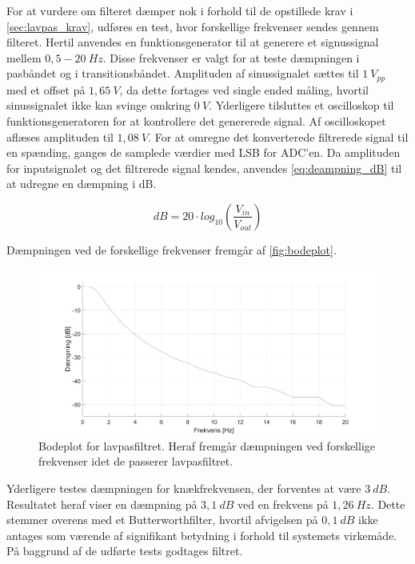 For at vurdere om filteret dæmper nok i forhold til de opstillede krav i \autoref{sec:lavpas_krav}, udføres en test, hvor forskellige frekvenser sendes gennem filteret. 
Hertil anvendes en funktionsgenerator til at generere et signussignal mellem $0,5-20~Hz$. 
Disse frekvenser er valgt for at teste dæmpningen i pasbåndet og i transitionsbåndet.  
Amplituden af sinussignalet sættes til $1~V_{pp}$ med et offset på $1,65~V$, da dette fortages ved single ended måling, hvortil sinussignalet ikke kan svinge omkring $0~V$. 
Yderligere tilsluttes et oscilloskop til funktionsgeneratoren for at kontrollere det genererede signal. Af oscilloskopet aflæses amplituden til $1,08~V$.  
For at omregne det konverterede filtrerede signal til en spænding, ganges de samplede værdier med LSB for ADC'en. 
Da amplituden for inputsignalet og det filtrerede signal kendes, anvendes \autoref{eq:deampning_dB} til at udregne en dæmpning i dB.

\begin{equation} \label{eq:deampning_dB}
	dB = 20 \cdot log_{10}(\frac{V_{in}}{V_{out}})
\end{equation}

\noindent
Dæmpningen ved de forskellige frekvenser fremgår af \autoref{fig:bodeplot}.

\begin{figure}[H]
\centering
\includegraphics[width=1\textwidth]{figures/bodeplot_lavpas2}
\caption{Bodeplot for lavpasfiltret. Heraf fremgår dæmpningen ved forskellige frekvenser idet de passerer lavpasfiltret.}
\label{fig:bodeplot}
\end{figure}

\noindent
Yderligere testes dæmpningen for knækfrekvensen, der forventes at være $3~dB$. 
Resultatet heraf viser en dæmpning på $3,1~dB$ ved en frekvens på $1,26~Hz$. 
Dette stemmer overens med et Butterworthfilter, hvortil afvigelsen på $0,1~dB$ ikke antages som værende af signifikant betydning i forhold til systemets virkemåde. 
På baggrund af de udførte tests godtages filtret. 

